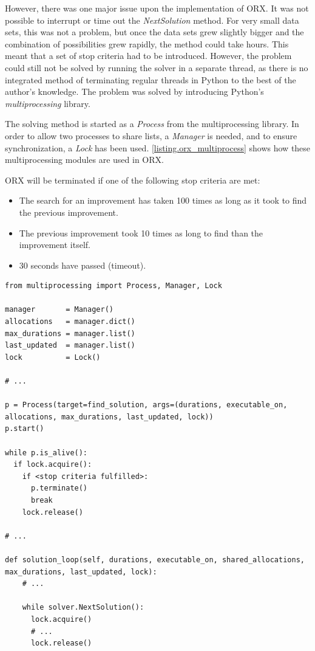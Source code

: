 However, there was one major issue upon the implementation of ORX. It was not possible to interrupt or time out the \emph{NextSolution} method. For very small data sets, this was not a problem, but once the data sets grew slightly bigger and the combination of possibilities grew rapidly, the method could take hours. This meant that a set of stop criteria had to be introduced. However, the problem could still not be solved by running the solver in a separate thread, as there is no integrated method of terminating regular threads in Python to the best of the author's knowledge. The problem was solved by introducing Python's \emph{multiprocessing} library.

The solving method is started as a \emph{Process} from the multiprocessing library. In order to allow two processes to share lists, a \emph{Manager} is needed, and to ensure synchronization, a \emph{Lock} has been used. \lstlistingname \space \ref{listing.orx_multiprocess} shows how these multiprocessing modules are used in ORX.

ORX will be terminated if one of the following stop criteria are met:

\begin{itemize}
    \item The search for an improvement has taken 100 times as long as it took to find the previous improvement.
    \item The previous improvement took 10 times as long to find than the improvement itself.
    \item 30 seconds have passed (timeout).
\end{itemize}

\vspace{4mm}
\noindent\begin{minipage}{\textwidth}
\begin{lstlisting}[caption=ORX Multiprocessing, label={listing.orx_multiprocess}]
from multiprocessing import Process, Manager, Lock

manager       = Manager()
allocations   = manager.dict()
max_durations = manager.list()
last_updated  = manager.list()
lock          = Lock()

# ...

p = Process(target=find_solution, args=(durations, executable_on, allocations, max_durations, last_updated, lock))
p.start()

while p.is_alive():
  if lock.acquire():
    if <stop criteria fulfilled>:
      p.terminate()
      break
    lock.release()

# ...

def solution_loop(self, durations, executable_on, shared_allocations, max_durations, last_updated, lock):
    # ...
    
    while solver.NextSolution():
      lock.acquire()
      # ...
      lock.release()
\end{lstlisting}
\end{minipage}
